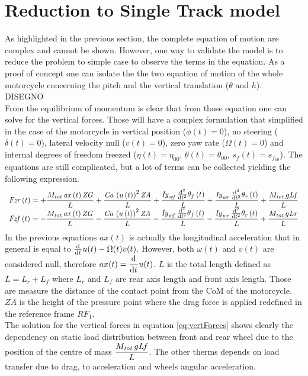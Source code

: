 \section{Reduction to Single Track model}
%
As highlighted in the previous section, the complete equation of motion are complex and cannot be shown. However, one way to validate the model is to reduce the problem to simple case to observe the terms in the equation. As a proof of concept one can isolate the the two equation of motion of the whole motorcycle concerning the pitch and the vertical translation ($\theta$ and $h$).\\
%
DISEGNO\\
%
From the equilibrium of momentum is clear that from those equation one can solve for the vertical forces. Those will have a complex formulation that simplified in the case of the motorcycle in vertical position ($\phi(t)=0$), no steering ($\delta(t)=0$), lateral velocity null ($v(t)=0$), zero yaw rate ($\Omega(t)=0$) and internal degrees of freedom freezed ($\eta(t)=\eta_00$, $\theta(t) = \theta_00$, $s_f(t)=s_{f_{00}}$). The equations are still complicated, but a lot of terms can be collected yielding the following expression.
%
\begin{equation}
    \label{eq:vertForces}
\begin{array}{c} 
\displaystyle
{\it Fzr} \left( t \right) =+{\frac {M_{{\it tot}}\,{\it ax} \left( t \right) {\it ZG}}{L}}+{\frac {{\it Ca}\,\left( u \left( t \right)  \right) ^{2}{\it ZA}}{L}}+{\frac {{\it Iy}_{{\it wf}}\,{\frac {{\rm d}^{2}}{{\rm d}{t}^{2}}}\theta_{f} \left( t \right) }{L}}+{\frac {{\it Iy}_{{\it wr}}\,{\frac {{\rm d}^{2}}{{\rm d}{t}^{2}}}\theta_{r} \left( t \right) }{L}}+{\frac {M_{{\it tot}}\,g{\it Lf}}{L}}\\
\displaystyle
{\it Fzf} \left( t \right) =-{\frac {M_{{\it tot}}\,{\it ax} \left( t \right) {\it ZG}}{L}}-{\frac {{\it Ca}\, \left( u \left( t \right)  \right) ^{2}{\it ZA}}{L}}-{\frac {{\it Iy}_{{\it wf}}\,{\frac {{\rm d}^{2}}{{\rm d}{t}^{2}}}\theta_{f} \left( t \right) }{L}}-{\frac {{\it Iy}_{{\it wr}}\,{\frac {{\rm d}^{2}}{{\rm d}{t}^{2}}}\theta_{r} \left( t \right) }{L}}+{\frac {M_{{\it tot}}\,g{\it Lr}}{L}}
\end{array}    
\end{equation}
%
In the previous equations $ax(t)$ is actually the longitudinal acceleration that in general is equal to $\frac {{\rm d}^{}}{{\rm d}{t}^{}}u(t)-\Omega(t) v(t)$. However, both $\omega(t)$ and $v(t)$ are considered null, therefore $\displaystyle ax(t) = \frac {{\rm d}^{}}{{\rm d}{t}^{}}u(t)$.
$L$ is the total length defined as $L= L_r+L_f$ where $L_r$ and $L_f$ are rear axis length and front axis length. Those are measure the distance of the contact point from the CoM of the motorcycle. $ZA$ is the height of the pressure point where the drag force is applied redefined in the reference frame $RF_1$.\\
The solution for the vertical forces in equation \ref{eq:vertForces} shows clearly the dependency on static load distribution between front and rear wheel due to the position of the centre of mass $\displaystyle{\frac {M_{{\it tot}}\,g{\it Lf}}{L}}$. The other therms depends on load transfer due to drag, to acceleration and wheels angular acceleration.\\
%